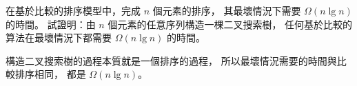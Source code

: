 \startEXERCISE
在基於比較的排序模型中，完成 $n$ 個元素的排序，
其最壞情況下需要 $\Omega(n\lg{n})$ 的時間。
試證明：由 $n$ 個元素的任意序列構造一棵二叉搜索樹，
任何基於比較的算法在最壞情況下都需要 $\Omega(n\lg{n})$ 的時間。
\stopEXERCISE

\startANSWER
構造二叉搜索樹的過程本質就是一個排序的過程，
所以最壞情況需要的時間與比較排序相同，
都是 $\Omega(n\lg{n})$。
\stopANSWER
